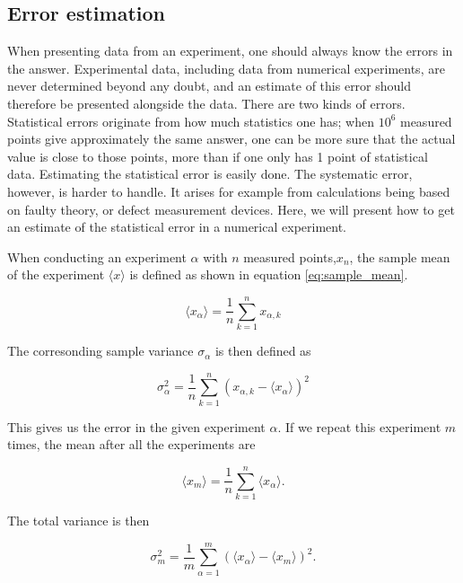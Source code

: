 \documentclass[norsk,a4paper,12pt]{article}
\begin{document}
\subsection{Error estimation} \label{Error_estimation}
When presenting data from an experiment, one should always know the errors in the answer. Experimental data, including data from numerical experiments, are never determined beyond any doubt, and an estimate of this error should therefore be presented alongside the data. 
There are two kinds of errors. Statistical errors originate from how much statistics one has; when $10^6$ measured points give approximately the same answer, one can be more sure that the actual value is close to those points, more than if one only has 1 point of statistical data. Estimating the statistical error is easily done. The systematic error, however, is harder to handle. It arises for example from calculations being based on faulty theory, or defect measurement devices. Here, we will present how to get an estimate of the statistical error in a numerical experiment.
\par 
\vspace{3mm}
When conducting an experiment $\alpha$ with $n$ measured points,$x_n$, the sample mean of the experiment $\langle x \rangle$ is defined as shown in equation \ref{eq:sample_mean}.

\begin{equation}
\label{eq:sample_mean}
\langle x_{\alpha} \rangle = \frac{1}{n} \sum_{k=1}^n x_{\alpha,k}
\end{equation}

The corresonding sample variance $\sigma_{\alpha}$ is then defined as

\begin{equation}
\sigma_{\alpha}^2 = \frac{1}{n} \sum_{k=1}^n (x_{\alpha,k} - \langle x_{\alpha} \rangle )^2
\end{equation}

This gives us the error in the given experiment $\alpha$. If we repeat this experiment $m$ times, the mean after all the experiments are

\begin{equation}
\label{eq:mean}
\langle x_{m} \rangle = \frac{1}{n} \sum_{k=1}^n  \langle x_{\alpha} \rangle.
\end{equation}

The total variance is then

\begin{equation}
\sigma_m^2 = \frac{1}{m} \sum_{\alpha=1}^m ( \langle x_{\alpha} \rangle - \langle x_{m} \rangle )^2.
\end{equation}
\end{document}
